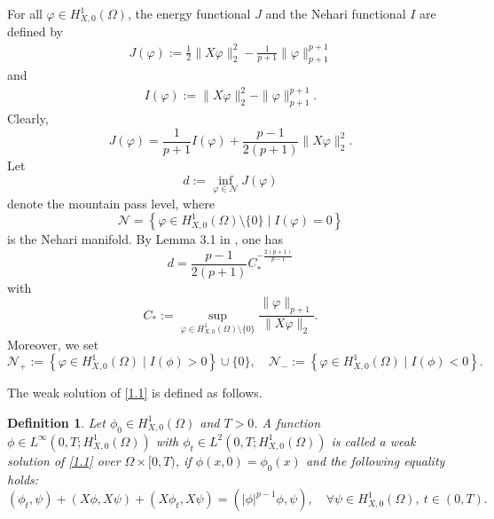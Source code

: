 \documentclass[11pt,a4paper]{article}
\numberwithin{equation}{section}
\newtheorem{defn}{Definition}[section]
\numberwithin{remark}{section}
\begin{document}
For all $\varphi\in H_{X,0}^1(\Omega)$, the energy functional $J$ and the Nehari functional $I$ are defined by
\begin{align}
J(\varphi):=\frac{1}{2}\|X\varphi\|_2^2-\frac{1}{p+1}\|\varphi\|_{p+1}^{p+1}\label{J}
\end{align}
and
\begin{align}
I(\varphi):=\|X\varphi\|_2^2-\|\varphi\|_{p+1}^{p+1}.\label{I}
\end{align}
Clearly,
\begin{equation}\label{JI}
J(\varphi)=\frac{1}{p+1}I(\varphi)+\frac{p-1}{2(p+1)}\|X\varphi\|_2^2.
\end{equation}
Let
\begin{equation}\label{d}
d:=\inf_{\varphi\in \mathcal{N}}J(\varphi)
\end{equation}
denote the mountain pass level, where
\begin{equation}\label{N}
\mathcal{N}=\left\{\varphi\in H_{X,0}^1(\Omega)\setminus\{0\}\mid I(\varphi)=0\right\}
\end{equation}
is the Nehari manifold. By Lemma 3.1 in \cite{MR3961341}, one has
\begin{equation}\label{djingquezhi}
d=\frac{p-1}{2(p+1)}C_*^{-\frac{2(p+1)}{p-1}}
\end{equation}
with
\begin{equation}\label{qianru}
C_*:=\sup_{\varphi\in H_{X,0}^1(\Omega)\setminus\{0\}}\frac{\|\varphi\|_{p+1}}{\|X\varphi\|_2}.
\end{equation}
Moreover, we set
\begin{equation}\label{Nzhengfu}
\mathcal{N}_+:=\left\{\varphi\in H_{X,0}^1(\Omega)\mid I(\phi)>0\right\}\cup\{0\},\quad \mathcal{N}_-:=\left\{\varphi\in H_{X,0}^1(\Omega)\mid I(\phi)<0\right\}.
\end{equation}


The weak solution of \eqref{1.1} is defined as follows.
\begin{defn}\label{weaksolution}
Let $\phi_0\in H_{X,0}^1(\Omega)$ and $T>0$. A function $\phi\in L^\infty\left(0,T;H_{X,0}^1(\Omega)\right)$ with $\phi_t\in L^2(0,T;H_{X,0}^1(\Omega))$ is called a weak solution of \eqref{1.1} over $\Omega\times[0,T)$, if $\phi(x,0)=\phi_0(x)$ and the following equality holds:
\begin{equation}\label{weakdengshi}
(\phi_t,\psi)+(X\phi,X\psi)+(X\phi_t,X\psi)=(|\phi|^{p-1}\phi,\psi),\quad  \forall\psi\in H_{X,0}^1(\Omega),~t\in(0,T).
\end{equation}
\end{defn}
\end{document}
